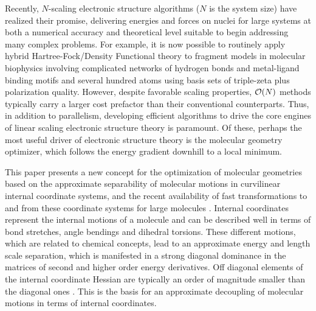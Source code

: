 \documentclass[prl,twocolumn,showpacs,twocolumngrid,superbib]{revtex4}
\begin{document}
Recently, $N$-scaling electronic structure algorithms ($N$ is the system size)  have 
realized their promise, delivering energies and forces on nuclei for large systems at 
both a numerical accuracy and theoretical level suitable to begin addressing many complex 
problems.  For example, it is now possible to routinely apply hybrid Hartree-Fock/Density 
Functional theory to fragment models in molecular biophysics involving complicated 
networks of hydrogen bonds and metal-ligand binding motifs and several hundred atoms using basis sets of triple-zeta plus 
polarization quality.  However, despite favorable scaling properties, ${\cal O}(N)$ 
methods typically carry a larger cost prefactor than their conventional counterparts.  Thus, 
in addition to parallelism, developing efficient algorithms to drive the core engines of 
linear scaling electronic structure theory is paramount.  Of these, perhaps the most useful 
driver of electronic structure theory is the molecular geometry optimizer, which follows 
the energy gradient downhill to a local minimum.   

This paper presents a new concept for the optimization of molecular geometries based on
the approximate separability of 
molecular motions
in curvilinear internal coordinate 
systems, and the recent availability of fast transformations to and from these coordinate systems 
for large molecules \cite{paizs_coordtrf1,nemeth_coordtrf1,paizs_coordtrf2,nemeth_coordtrf2}.  
Internal coordinates represent the internal motions of a molecule and can 
be described well in terms of bond stretches, angle bendings and dihedral torsions.
These different motions, which are related to chemical concepts, lead to
an approximate energy and length scale separation, which is manifested
in a strong diagonal dominance in the matrices of second and higher order
energy derivatives.
Off diagonal elements of the 
internal coordinate Hessian are typically an order of magnitude smaller than the diagonal ones
\cite{pulay_69,fogarasi_diaghess,Pulay_natural_internals,pulay_review,pulay_dynamics}.
This is the basis for an approximate decoupling of molecular motions in terms of internal coordinates.
\end{document}
